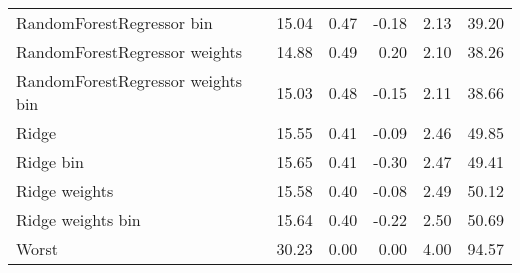 \documentclass[]{article}
\begin{document}
\begin{table}
{\begin{tabular}{lrrrrr}
RandomForestRegressor bin         &     15.04 &  0.47 &  -0.18 & 2.13 &       39.20 \\
RandomForestRegressor weights     &     14.88 &  0.49 &   0.20 & 2.10 &       38.26 \\
RandomForestRegressor weights bin &     15.03 &  0.48 &  -0.15 & 2.11 &       38.66 \\
Ridge                             &     15.55 &  0.41 &  -0.09 & 2.46 &       49.85 \\
Ridge bin                         &     15.65 &  0.41 &  -0.30 & 2.47 &       49.41 \\
Ridge weights                     &     15.58 &  0.40 &  -0.08 & 2.49 &       50.12 \\
Ridge weights bin                 &     15.64 &  0.40 &  -0.22 & 2.50 &       50.69 \\
Worst                             &     30.23 &  0.00 &   0.00 & 4.00 &       94.57 \\
\bottomrule
\end{tabular}
 }
\end{table}
\end{document}
